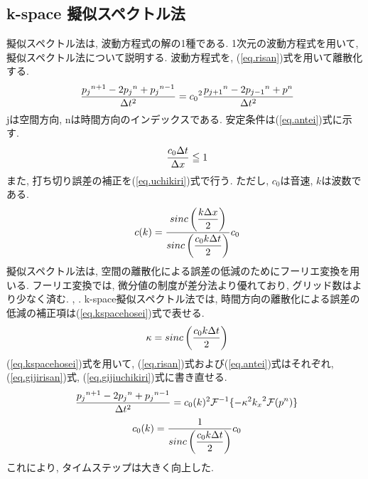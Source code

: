\subsection{k-space 擬似スペクトル法}
擬似スペクトル法は, 波動方程式の解の1種である. 1次元の波動方程式を用いて, 擬似スペクトル法について説明する. 波動方程式を, (\ref{eq.risan})式を用いて離散化する. 
\begin{equation}
\label{eq.risan}
\\\ \frac{{p_j} ^{n+1} - 2{p_j}^n + {p_j}^{n-1}} {\Delta t^2}= {c_0}^2 \frac{{p_{j+1}} ^n - 2{p_{j-1}}^n + p^n} {\Delta t^2}
\end{equation}
jは空間方向, nは時間方向のインデックスである. 安定条件は(\ref{eq.antei})式に示す.
\begin{equation}
\label{eq.antei}
\\\ \frac{c_0 \Delta t}{\Delta x} \leqq 1
\end{equation}
また, 打ち切り誤差の補正を(\ref{eq.uchikiri})式で行う. ただし, $c_0$は音速, $k$は波数である.
\begin{equation}
\label{eq.uchikiri}
\\\ c(k) = \dfrac{sinc \left(\dfrac{k \Delta x}{2} \right)}{sinc \left(\dfrac{c_0 k \Delta t}{2} \right)} c_0
\end{equation}
擬似スペクトル法は, 空間の離散化による誤差の低減のためにフーリエ変換を用いる. フーリエ変換では, 微分値の制度が差分法より優れており, グリッド数はより少なく済む. \cite{hayashisan[36]}, \cite{hayashisan[37]}. k-space擬似スペクトル法では, 時間方向の離散化による誤差の低減の補正項は(\ref{eq.kspacehosei})式で表せる.
\begin{equation}
\label{eq.kspacehosei}
\\\ \kappa = sinc \left(\dfrac{c_0 k \Delta t}{2} \right)
\end{equation}
(\ref{eq.kspacehosei})式を用いて, (\ref{eq.risan})式および(\ref{eq.antei})式はそれぞれ, (\ref{eq.gijirisan})式, (\ref{eq.gijiuchikiri})式に書き直せる. 
\begin{equation}
\label{eq.gijirisan}
\\\ \frac{{p_j} ^{n+1} - 2{p_j}^n + {p_j}^{n-1}} {\Delta t^2}= {c_0}(k)^2 \mathcal{F}^{-1}\{ {-\kappa}^2 {k_x}^2  \mathcal{F}(p^n)\} 
\end{equation}
\begin{equation}
\label{eq.gijiuchikiri}
\\\ c_0(k) = \frac{1}{sinc \left(\dfrac{c_0 k \Delta t}{2} \right)} c_0
\end{equation}
これにより, タイムステップは大きく向上した.
